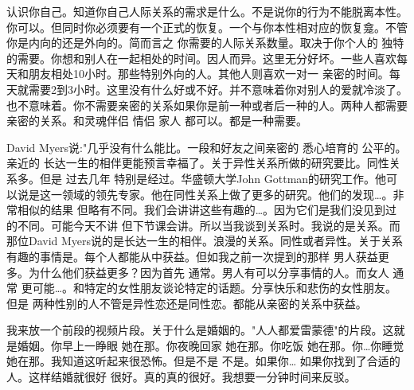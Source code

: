 认识你自己。知道你自己人际关系的需求是什么。不是说你的行为不能脱离本性。你可以。但同时你必须要有一个正式的恢复。一个与你本性相对应的恢复龛。不管你是内向的还是外向的。简而言之 你需要的人际关系数量。取决于你个人的 独特的需要。你想和别人在一起相处的时间。因人而异。这里无分好坏。一些人喜欢每天和朋友相处10小时。那些特别外向的人。其他人则喜欢一对一 亲密的时间。每天就需要2到3小时。这里没有什么好或不好。并不意味着你对别人的爱就冷淡了。也不意味着。你不需要亲密的关系如果你是前一种或者后一种的人。两种人都需要亲密的关系。和灵魂伴侣 情侣 家人 都可以。都是一种需要。 

David Myers说:"几乎没有什么能比。一段和好友之间亲密的 悉心培育的 公平的。亲近的 长达一生的相伴更能预言幸福了。关于异性关系所做的研究要比。同性关系多。但是 过去几年 特别是经过。华盛顿大学John Gottman的研究工作。他可以说是这一领域的领先专家。他在同性关系上做了更多的研究。他们的发现…。非常相似的结果 但略有不同。我们会讲讲这些有趣的…。因为它们是我们没见到过的不同。可能今天不讲 但下节课会讲。所以当我谈到关系时。我说的是关系。而那位David Myers说的是长达一生的相伴。浪漫的关系。同性或者异性。关于关系有趣的事情是。每个人都能从中获益。但如我之前一次提到的那样 男人获益更多。为什么他们获益更多？因为首先 通常。男人有可以分享事情的人。而女人 通常 更可能…。和特定的女性朋友谈论特定的话题。分享快乐和悲伤的女性朋友。但是 两种性别的人不管是异性恋还是同性恋。都能从亲密的关系中获益。 

我来放一个前段的视频片段。关于什么是婚姻的。"人人都爱雷蒙德"的片段。这就是婚姻。你早上一睁眼 她在那。你夜晚回家 她在那。你吃饭 她在那。你…你睡觉 她在那。我知道这听起来很恐怖。但是不是 不是。如果你… 如果你找到了合适的人。这样结婚就很好 很好。真的真的很好。我想要一分钟时间来反驳。 

